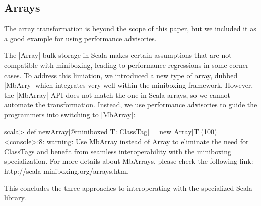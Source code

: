 \subsection{Arrays}
\label{sec:mbarrays}

The array transformation \cite{romain-mbarrays} is beyond the scope of this paper, but we included it as a good example for using performance advisories.

The |Array| bulk storage in Scala makes certain assumptions that are not compatible with miniboxing, leading to performance regressions in some corner cases. To address this limiation, we introduced a new type of array, dubbed |MbArry| which integrates very well within the miniboxing framework. However, the |MbArray| API does not match the one in Scala arrays, so we cannot automate the transformation. Instead, we use performance advisories to guide the programmers into switching to |MbArray|:

\begin{lstlisting-nobreak-nolang}
scala> def newArray[@miniboxed T: ClassTag] = new Array[T](100)
<console>:8: warning: Use MbArray instead of Array to eliminate the need for ClassTags and benefit from seamless interoperability with the miniboxing specialization. For more details about MbArrays, please check the following link: http://scala-miniboxing.org/arrays.html
\end{lstlisting-nobreak-nolang}

This concludes the three approaches to interoperating with the specialized Scala library.

